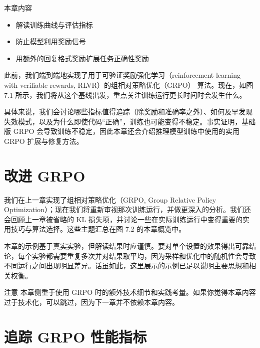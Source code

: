 \begin{myChapterIntro}{本章内容}
\begin{itemize}
\item 解读训练曲线与评估指标
\item 防止模型利用奖励信号
\item 用额外的回复格式奖励扩展任务正确性奖励
\end{itemize}
\end{myChapterIntro}

此前，我们端到端地实现了用于可验证奖励强化学习（reinforcement learning with verifiable rewards, RLVR）的组相对策略优化（GRPO）\emph{ }算法。现在，如图 7.1 所示，我们将从这个基线出发，重点关注训练运行更长时间时会发生什么。


具体来说，我们会讨论哪些指标值得追踪（除奖励和准确率之外）、如何及早发现失效模式，以及为什么即使代码“正确”，训练也可能变得不稳定。事实证明，基础版 GRPO 会导致训练不稳定，因此本章还会介绍推理模型训练中使用的实用 GRPO 扩展与修复方法。

\section{改进 GRPO}

我们在上一章实现了组相对策略优化（GRPO, Group Relative Policy Optimization）；现在我们将重新审视那次训练运行，并做更深入的分析。我们还会回顾上一章被省略的 KL 损失项，并讨论一些在实际训练运行中变得重要的实用技巧与算法选择。这些主题汇总在图 7.2 的本章概览中。


本章的示例基于真实实验，但解读结果时应谨慎。要对单个设置的效果得出可靠结论，每个实验都需要重复多次并对结果取平均，因为采样和优化中的随机性会导致不同运行之间出现明显差异。话虽如此，这里展示的示例已足以说明主要思想和相关权衡。

\begin{myWarning}{注意}
 本章侧重于使用 GRPO 时的额外技术细节和实践考量。如果你觉得本章内容过于技术化，可以跳过，因为下一章并不依赖本章内容。\end{myWarning}

\section{追踪 GRPO 性能指标}

